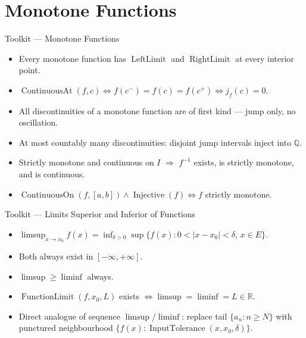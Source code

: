
\section{Monotone Functions}

\begin{toolkitbox}{Toolkit --- Monotone Functions}
\begin{itemize}
  \item Every monotone function has $\operatorname{LeftLimit}$ and
    $\operatorname{RightLimit}$ at every interior point.
  \item $\operatorname{ContinuousAt}(f,c)\iff f(c^-)=f(c)=f(c^+)
    \iff j_f(c)=0$.
  \item All discontinuities of a monotone function are of first kind
    --- jump only, no oscillation.
  \item At most countably many discontinuities: disjoint jump
    intervals inject into $\mathbb{Q}$.
  \item Strictly monotone and continuous on $I$ $\Rightarrow$
    $f^{-1}$ exists, is strictly monotone, and is continuous.
  \item $\operatorname{ContinuousOn}(f,[a,b])\wedge\operatorname{Injective}(f)
    \iff f$ strictly monotone.
\end{itemize}
\end{toolkitbox}


\begin{toolkitbox}{Toolkit --- Limits Superior and Inferior of Functions}
\begin{itemize}
  \item $\limsup_{x\to x_0}f(x)=\inf_{\delta>0}
    \sup\{f(x):0<|x-x_0|<\delta,\,x\in E\}$.
  \item Both always exist in $[-\infty,+\infty]$.
  \item $\limsup\geq\liminf$ always.
  \item $\operatorname{FunctionLimit}(f,x_0,L)$ exists
    $\iff\limsup=\liminf=L\in\mathbb{R}$.
  \item Direct analogue of sequence $\limsup$/$\liminf$: replace tail
    $\{a_n:n\geq N\}$ with punctured neighbourhood
    $\{f(x):\operatorname{InputTolerance}(x,x_0,\delta)\}$.
\end{itemize}
\end{toolkitbox}




